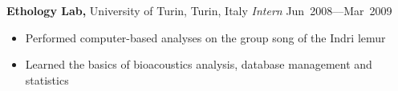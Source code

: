 
\vspace{5pt}

\textbf{Ethology Lab,} University of Turin, Turin, Italy
\emph{Intern} \hfill{Jun~2008–--Mar~2009}
\begin{itemize}
  \item Performed computer-based analyses on the group song of the Indri lemur
  \item Learned the basics of bioacoustics analysis, database management and statistics
\end{itemize}
